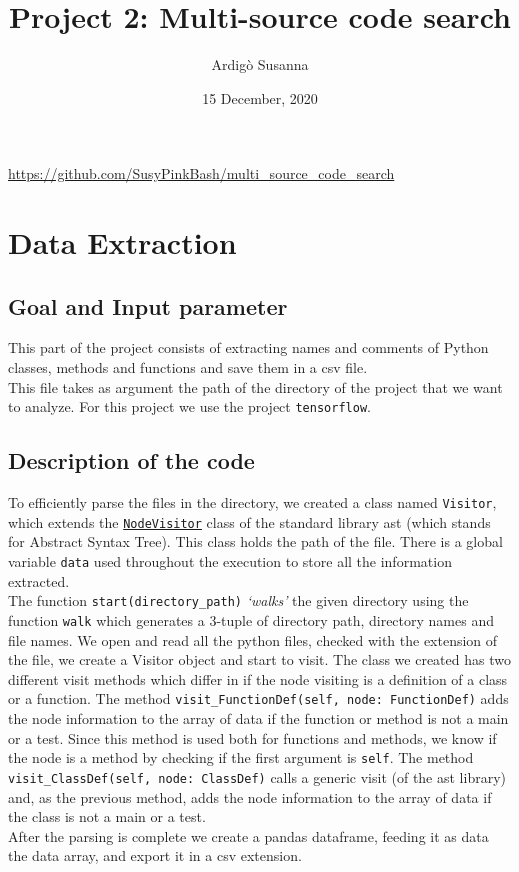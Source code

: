 \documentclass [14 pt]{article}
\title{Project 2: Multi-source code search}
\author{Ardig\`o Susanna}
\date{15 December, 2020}
\begin{document}
\pagestyle{fancy}
\fancyhf{}
\cfoot{\thepage}

\begin{titlingpage}
\maketitle
\centering
\url{https://github.com/SusyPinkBash/multi_source_code_search}
\end{titlingpage}

\newpage\thispagestyle{plain}
\tableofcontents
\newpage

\section{Data Extraction} %
\subsection{Goal and Input parameter} %
This part of the project consists of extracting names and comments of Python classes, methods and functions and save them in a csv file.\\
This file takes as argument the path of the directory of the project that we want to analyze. For this project we use the project \texttt{tensorflow}.

\subsection{Description of the code} %
To efficiently parse the files in the directory, we created a class named \texttt{Visitor}, which extends the \href{https://docs.python.org/3/library/ast.html#ast.NodeVisitor}{\texttt{NodeVisitor}} class of the standard library ast (which stands for Abstract Syntax Tree). This class holds the path of the file. There is a global variable \texttt{data} used throughout the execution to store all the information extracted.\\
The function \texttt{start(directory\_path)} \emph{`walks'} the given directory using the function \texttt{walk} which generates a 3-tuple of directory path, directory names and file names. We open and read all the python files, checked with the extension of the file, we create a Visitor object and start to visit. The class we created has two different visit methods which differ in if the node visiting is a definition of a class or a function.
The method \texttt{visit\_FunctionDef(self, node: FunctionDef)} adds the node information to the array of data if the function or method is not a main or a test. Since this method is used both for functions and methods, we know if the node is a method by checking if the first argument is \texttt{self}.
The method \texttt{visit\_ClassDef(self, node: ClassDef)} calls a generic visit (of the ast library) and, as the previous method, adds the node information to the array of data if the class is not a main or a test. \\
After the parsing is complete we create a pandas dataframe, feeding it as data the data array, and export it in a csv extension.
\end{document}
